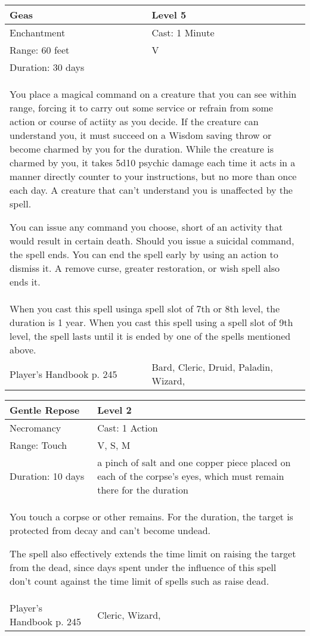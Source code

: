 \documentclass[11pt]{report}
\begin{document}
\begin{table}[H]
	\begin{tabular}{||p{6cm}|p{6cm}||}
		\hline\hline
		\bf{Geas} & Level 5\\ \hline
		Enchantment & Cast: 1 Minute\\ \hline
		Range: 60 feet & V\\ \hline
		Duration: 30 days & \\ \hline
		\multicolumn{2}{||p{12cm}||}{You place a magical command on a creature that you can see within range, forcing it to carry out some service or refrain from some action or course of actiity as you decide.
If the creature can understand you, it must succeed on a Wisdom saving throw or become charmed by you for the duration. While the creature is charmed by you, it takes 5d10 psychic damage each time it acts in a manner directly counter to your instructions, but no more than once each day. A creature that can’t understand you is unaffected by the spell.

You can issue any command you choose, short of an activity that would result in certain death. Should you issue a suicidal command, the spell ends. You can end the spell early by using an action to dismiss it. A remove curse, greater restoration, or wish spell also ends it.}\\ \hline
		\multicolumn{2}{||p{12cm}||}{When you cast this spell usinga spell slot of 7th or 8th level, the duration is 1 year.
When you cast this spell using a spell slot of 9th level, the spell lasts until it is ended by one of the spells mentioned above.}\\ \hline
Player's Handbook p. 245 & Bard, Cleric, Druid, Paladin, Wizard, \\ \hline\hline
	\end{tabular}
\end{table}

\begin{table}[H]
	\begin{tabular}{||p{6cm}|p{6cm}||}
		\hline\hline
		\bf{Gentle Repose} & Level 2\\ \hline
		Necromancy & Cast: 1 Action\\ \hline
		Range: Touch & V, S, M\\ \hline
		Duration: 10 days & a pinch of salt and one copper piece placed on each of the corpse’s eyes, which must remain there for the duration\\ \hline
		\multicolumn{2}{||p{12cm}||}{You touch a corpse or other remains. For the duration, the target is protected from decay and can’t become undead.

The spell also effectively extends the time limit on raising the target from the dead, since days spent under the influence of this spell don’t count against the time limit of spells such as raise dead.}\\ \hline
Player's Handbook p. 245 & Cleric, Wizard, \\ \hline\hline
	\end{tabular}
\end{table}
\end{document}

